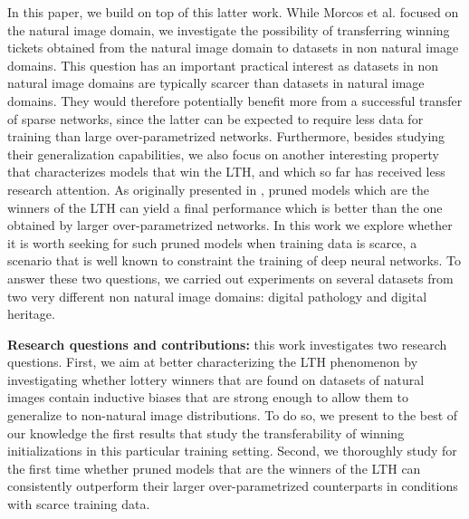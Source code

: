 In this paper, we build on top of this latter work. While Morcos et al. \cite{morcos2019one} focused on the natural image domain, we investigate the possibility of transferring winning tickets obtained from the natural image domain to datasets in non natural image domains. This question has an important practical interest as datasets in non natural image domains are typically scarcer than datasets in natural image domains. They would therefore potentially benefit more from a successful transfer of sparse networks, since the latter can be expected to require less data for training than large over-parametrized networks. Furthermore, besides studying their generalization capabilities, we also focus on another interesting property that characterizes models that win the LTH, and which so far has received less research attention. As originally presented in \cite{frankle2018lottery}, pruned models which are the winners of the LTH can yield a final performance which is better than the one obtained by larger over-parametrized networks. In this work we explore whether it is worth seeking for such pruned models when training data is scarce, a scenario that is well known to constraint the training of deep neural networks. To answer these two questions, we carried out experiments on several datasets from two very different non natural image domains: digital pathology and digital heritage.

\textbf{Research questions and contributions:} this work investigates two research questions. First, we aim at better characterizing the LTH phenomenon by investigating whether lottery winners that are found on datasets of natural images contain inductive biases that are strong enough to allow them to generalize to non-natural image distributions. To do so, we present to the best of our knowledge the first results that study the transferability of winning initializations in this particular training setting. Second, we thoroughly study for the first time whether pruned models that are the winners of the LTH can consistently outperform their larger over-parametrized counterparts in conditions with scarce training data.
